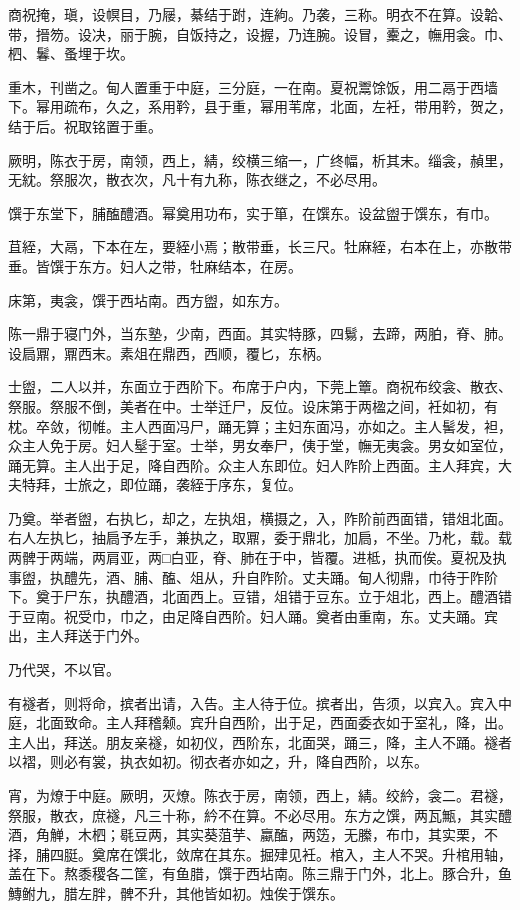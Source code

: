 \documentclass[]{article}
\begin{document}
商祝掩，瑱，设幎目，乃屦，綦结于跗，连絇。乃袭，三称。明衣不在算。设韐、带，搢笏。设决，丽于腕，自饭持之，设握，乃连腕。设冒，櫜之，幠用衾。巾、柶、鬊、蚤埋于坎。

重木，刊凿之。甸人置重于中庭，三分庭，一在南。夏祝鬻馀饭，用二鬲于西墙下。幂用疏布，久之，系用靲，县于重，幂用苇席，北面，左衽，带用靲，贺之，结于后。祝取铭置于重。

厥明，陈衣于房，南领，西上，綪，绞横三缩一，广终幅，析其末。缁衾，赬里，无紞。祭服次，散衣次，凡十有九称，陈衣继之，不必尽用。

馔于东堂下，脯醢醴酒。幂奠用功布，实于箪，在馔东。设盆盥于馔东，有巾。

苴絰，大鬲，下本在左，要絰小焉；散带垂，长三尺。牡麻絰，右本在上，亦散带垂。皆馔于东方。妇人之带，牡麻结本，在房。

床第，夷衾，馔于西坫南。西方盥，如东方。

陈一鼎于寝门外，当东塾，少南，西面。其实特豚，四鬄，去蹄，两胉，脊、肺。设扃鼏，鼏西末。素俎在鼎西，西顺，覆匕，东柄。

士盥，二人以并，东面立于西阶下。布席于户内，下莞上簟。商祝布绞衾、散衣、祭服。祭服不倒，美者在中。士举迁尸，反位。设床第于两楹之间，衽如初，有枕。卒敛，彻帷。主人西面冯尸，踊无算；主妇东面冯，亦如之。主人髺发，袒，众主人免于房。妇人髽于室。士举，男女奉尸，侇于堂，幠无夷衾。男女如室位，踊无算。主人出于足，降自西阶。众主人东即位。妇人阼阶上西面。主人拜宾，大夫特拜，士旅之，即位踊，袭絰于序东，复位。

乃奠。举者盥，右执匕，却之，左执俎，横摄之，入，阼阶前西面错，错俎北面。右人左执匕，抽扃予左手，兼执之，取鼏，委于鼎北，加扃，不坐。乃朼，载。载两髀于两端，两肩亚，两□白亚，脊、肺在于中，皆覆。进柢，执而俟。夏祝及执事盥，执醴先，酒、脯、醢、俎从，升自阼阶。丈夫踊。甸人彻鼎，巾待于阼阶下。奠于尸东，执醴酒，北面西上。豆错，俎错于豆东。立于俎北，西上。醴酒错于豆南。祝受巾，巾之，由足降自西阶。妇人踊。奠者由重南，东。丈夫踊。宾出，主人拜送于门外。

乃代哭，不以官。

有襚者，则将命，摈者出请，入告。主人待于位。摈者出，告须，以宾入。宾入中庭，北面致命。主人拜稽颡。宾升自西阶，出于足，西面委衣如于室礼，降，出。主人出，拜送。朋友亲襚，如初仪，西阶东，北面哭，踊三，降，主人不踊。襚者以褶，则必有裳，执衣如初。彻衣者亦如之，升，降自西阶，以东。

宵，为燎于中庭。厥明，灭燎。陈衣于房，南领，西上，綪。绞紟，衾二。君襚，祭服，散衣，庶襚，凡三十称，紟不在算。不必尽用。东方之馔，两瓦甒，其实醴酒，角觯，木柶；毼豆两，其实葵菹芋、蠃醢，两笾，无縢，布巾，其实栗，不择，脯四脡。奠席在馔北，敛席在其东。掘肂见衽。棺入，主人不哭。升棺用轴，盖在下。熬黍稷各二筐，有鱼腊，馔于西坫南。陈三鼎于门外，北上。豚合升，鱼鱄鲋九，腊左胖，髀不升，其他皆如初。烛俟于馔东。
\end{document}
